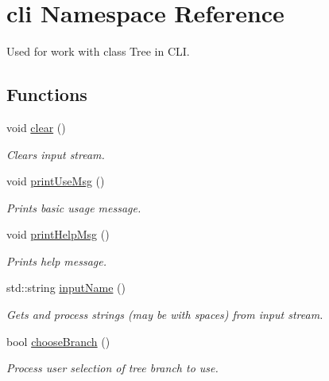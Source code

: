 \hypertarget{namespacecli}{\section{cli Namespace Reference}
\label{namespacecli}
}


Used for work with class Tree in C\-L\-I.  


\subsection*{Functions}
\begin{DoxyCompactItemize}
\item 
\hypertarget{namespacecli_af03ae5779bc6d1ef6ea0d26e052e5ead}{void \hyperlink{namespacecli_af03ae5779bc6d1ef6ea0d26e052e5ead}{clear} ()}\label{namespacecli_af03ae5779bc6d1ef6ea0d26e052e5ead}

\begin{DoxyCompactList}\small\item\em Clears input stream. \end{DoxyCompactList}\item 
\hypertarget{namespacecli_a532bad7ea5db107b523244fcac93aaef}{void \hyperlink{namespacecli_a532bad7ea5db107b523244fcac93aaef}{print\-Use\-Msg} ()}\label{namespacecli_a532bad7ea5db107b523244fcac93aaef}

\begin{DoxyCompactList}\small\item\em Prints basic usage message. \end{DoxyCompactList}\item 
\hypertarget{namespacecli_a773376d1405b7896ded70368022ca7c6}{void \hyperlink{namespacecli_a773376d1405b7896ded70368022ca7c6}{print\-Help\-Msg} ()}\label{namespacecli_a773376d1405b7896ded70368022ca7c6}

\begin{DoxyCompactList}\small\item\em Prints help message. \end{DoxyCompactList}\item 
\hypertarget{namespacecli_a99771d2f58982bc684fc57765e964538}{std\-::string \hyperlink{namespacecli_a99771d2f58982bc684fc57765e964538}{input\-Name} ()}\label{namespacecli_a99771d2f58982bc684fc57765e964538}

\begin{DoxyCompactList}\small\item\em Gets and process strings (may be with spaces) from input stream. \end{DoxyCompactList}\item 
bool \hyperlink{namespacecli_af6d116280d09587b4754e10973a9aee3}{choose\-Branch} ()
\begin{DoxyCompactList}\small\item\em Process user selection of tree branch to use. \end{DoxyCompactList}\end{DoxyCompactItemize}


